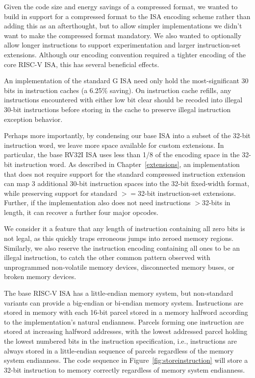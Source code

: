 \begin{samepage-commentary}
Given the code size and energy savings of a compressed format, we
wanted to build in support for a compressed format to the ISA encoding
scheme rather than adding this as an afterthought, but to allow
simpler implementations we didn't want to make the compressed format
mandatory. We also wanted to optionally allow longer instructions to
support experimentation and larger instruction-set extensions.
Although our encoding convention required a tighter encoding of the
core RISC-V ISA, this has several beneficial effects.

An implementation of the standard G ISA need only hold the
most-significant 30 bits in instruction caches (a 6.25\% saving).  On
instruction cache refills, any instructions encountered with either
low bit clear should be recoded into illegal 30-bit instructions
before storing in the cache to preserve illegal instruction exception
behavior.

Perhaps more importantly, by condensing our base ISA into a subset of
the 32-bit instruction word, we leave more space available for custom
extensions.  In particular, the base RV32I ISA uses less than 1/8 of
the encoding space in the 32-bit instruction word.  As described in
Chapter~\ref{extensions}, an implementation that does not require
support for the standard compressed instruction extension can map 3
additional 30-bit instruction spaces into the 32-bit fixed-width
format, while preserving support for standard $>=$32-bit
instruction-set extensions.  Further, if the implementation also does
not need instructions $>$32-bits in length, it can recover a further
four major opcodes.
\end{samepage-commentary}
\begin{commentary}
We consider it a feature that any length of instruction containing all
zero bits is not legal, as this quickly traps erroneous jumps into
zeroed memory regions. Similarly, we also reserve the instruction
encoding containing all ones to be an illegal instruction, to catch
the other common pattern observed with unprogrammed non-volatile
memory devices, disconnected memory buses, or broken memory devices.
\end{commentary}

The base RISC-V ISA has a little-endian memory system, but
non-standard variants can provide a big-endian or bi-endian memory
system.  Instructions are stored in memory with each 16-bit parcel
stored in a memory halfword according to the implementation's natural
endianness. Parcels forming one instruction are stored at
increasing halfword addresses, with the lowest addressed parcel
holding the lowest numbered bits in the instruction specification,
i.e., instructions are always stored in a little-endian sequence of
parcels regardless of the memory system endianness.  The code sequence
in Figure~\ref{fig:storeinstruction} will store a 32-bit instruction
to memory correctly regardless of memory system endianness.

